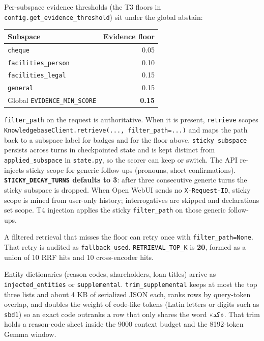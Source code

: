 Per-subspace evidence thresholds (the T3 floors in \texttt{config.get\_evidence\_threshold}) sit under the global abstain:

\begin{longtable}[]{@{}lr@{}}
\toprule\noalign{}
Subspace & Evidence floor \\
\midrule\noalign{}
\endhead
\bottomrule\noalign{}
\endlastfoot
\texttt{cheque} & 0.05 \\
\texttt{facilities\_person} & 0.10 \\
\texttt{facilities\_legal} & 0.15 \\
\texttt{general} & 0.15 \\
Global \texttt{EVIDENCE\_MIN\_SCORE} & \textbf{0.15} \\
\end{longtable}

\texttt{filter\_path} on the request is authoritative. When it is present, \texttt{retrieve} scopes \texttt{KnowledgebaseClient.retrieve(...,\ filter\_path=...)} and maps the path back to a subspace label for badges and for the floor above. \texttt{sticky\_subspace} persists across turns in checkpointed state and is kept distinct from \texttt{applied\_subspace} in \texttt{state.py}, so the scorer can keep or switch. The API re-injects sticky scope for generic follow-ups (pronouns, short confirmations). \textbf{\texttt{STICKY\_DECAY\_TURNS} defaults to 3}: after three consecutive generic turns the sticky subspace is dropped. When Open WebUI sends no \texttt{X-Request-ID}, sticky scope is mined from user-only history; interrogatives are skipped and declarations set scope. T4 injection applies the sticky \texttt{filter\_path} on those generic follow-ups.

A filtered retrieval that misses the floor can retry once with \texttt{filter\_path=None}. That retry is audited as \texttt{fallback\_used}. \texttt{RETRIEVAL\_TOP\_K} is \textbf{20}, formed as a union of 10 RRF hits and 10 cross-encoder hits.

Entity dictionaries (reason codes, shareholders, loan titles) arrive as \texttt{injected\_entities} or \texttt{supplemental}. \texttt{trim\_supplemental} keeps at most the top three lists and about 4 KB of serialized JSON each, ranks rows by query-token overlap, and doubles the weight of code-like tokens (Latin letters or digits such as \texttt{sbd1}) so an exact code outranks a row that only shares the word «کد». That trim holds a reason-code sheet inside the 9000 context budget and the 8192-token Gemma window.

